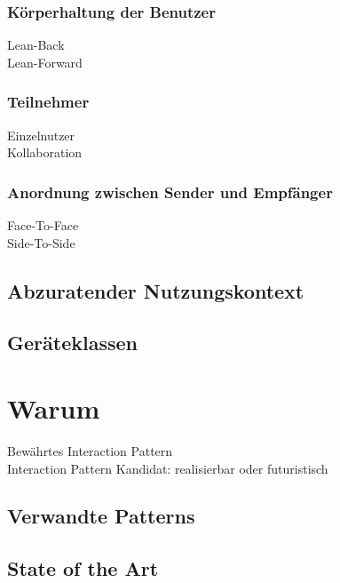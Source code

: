 \subsubsection*{Körperhaltung der Benutzer}
\checkbox{\leanback} Lean-Back \\
\checkbox{\leanforward} Lean-Forward 

\subsubsection*{Teilnehmer}
\checkbox{\single} Einzelnutzer \\
\checkbox{\collaboration} Kollaboration

\subsubsection*{Anordnung zwischen Sender und Empfänger}
\checkbox{\facetoface} Face-To-Face \\
\checkbox{\sidetoside} Side-To-Side

\subsection*{Abzuratender Nutzungskontext}
\notvalidcontext

\subsection*{Geräteklassen}
\devicetabular




\section*{Warum}
\checkbox{\established} Bewährtes Interaction Pattern \\
\checkbox{\candidate} Interaction Pattern Kandidat: 
\checkbox{\realizable} realisierbar oder
\checkbox{\futuristic} futuristisch

\subsection*{Verwandte Patterns}
\otherpatterns

\subsection*{State of the Art}
\stateoftheart

